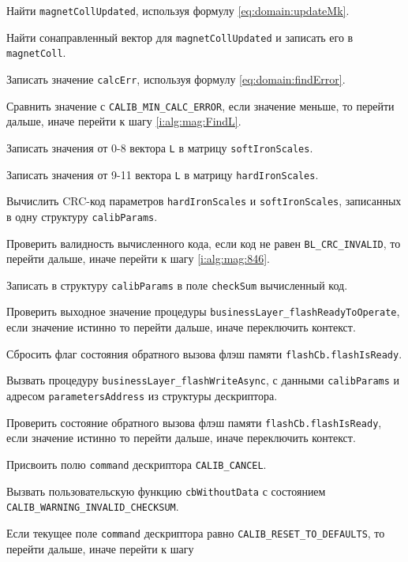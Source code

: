 \begin{enumerate_step}
    \item Найти \lstinline|magnetCollUpdated|, используя формулу \ref{eq:domain:updateMk}.
    \item Найти сонаправленный вектор для \lstinline|magnetCollUpdated| и записать его в \lstinline|magnetColl|.
    \item Записать значение \lstinline|calcErr|, используя формулу \ref{eq:domain:findError}.
    \item Сравнить значение с \lstinline|CALIB_MIN_CALC_ERROR|, если значение меньше, то перейти дальше, иначе перейти к шагу \ref{i:alg:mag:FindL}.
    \item Записать значения от 0-8 вектора \lstinline|L| в матрицу \lstinline|softIronScales|.
    \item Записать значения от 9-11 вектора \lstinline|L| в матрицу \lstinline|hardIronScales|.
    \item Вычислить CRC-код параметров \lstinline|hardIronScales| и \lstinline|softIronScales|, записанных в одну структуру \lstinline|calibParams|.
    \item Проверить валидность вычисленного кода, если код не равен \lstinline|BL_CRC_INVALID|, то перейти дальше, иначе перейти к шагу \ref{i:alg:mag:846}.
    \item Записать в структуру \lstinline|calibParams| в поле \lstinline|checkSum| вычисленный код.
    \item Проверить выходное значение процедуры \lstinline|businessLayer_flashReadyToOperate|, если значение истинно то перейти дальше, иначе переключить контекст.
    \item Сбросить флаг состояния обратного вызова флэш памяти \lstinline|flashCb.flashIsReady|.
    \item Вызвать процедуру \lstinline|businessLayer_flashWriteAsync|, с данными \lstinline|calibParams| и адресом \lstinline|parametersAddress| из структуры дескриптора.
    \item Проверить состояние обратного вызова флэш памяти \lstinline|flashCb.flashIsReady|, если значение истинно то перейти дальше, иначе переключить контекст.
    \item \label{i:alg:mag:846} Присвоить полю \lstinline|command| дескриптора \lstinline|CALIB_CANCEL|.
    \item Вызвать пользовательскую функцию \lstinline|cbWithoutData| с состоянием \lstinline|CALIB_WARNING_INVALID_CHECKSUM|.
    \item \label{i:alg:mag:1008} Если текущее поле \lstinline|command| дескриптора равно \lstinline|CALIB_RESET_TO_DEFAULTS|, то перейти дальше, иначе перейти к шагу

\end{enumerate_step}
